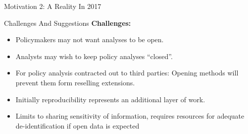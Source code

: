 \documentclass{beamer}
\newcommand{\backupend}{
   \setcounter{framenumber}{\value{finalframe}}
}
\begin{document}
\begin{frame}{Motivation 2: A Reality In 2017}
\end{frame}

  
\begin{frame}{Challenges And Suggestions}
\textbf{Challenges:}
\begin{itemize}
\item Policymakers may not want analyses to be open.
\item Analysts may wish to keep policy analyses ``closed''. 
\item For policy analysis contracted out to third parties: Opening methods will prevent them form reselling extensions.
\item  Initially reproducibility represents an additional layer of work.
\item Limits to sharing sensitivity of information, requires resources for adequate de-identification if open data is expected
\end{itemize}
\end{frame} 

\backupend
\end{document}
